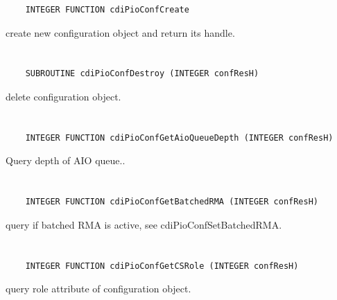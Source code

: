 \begin{verbatim}
    INTEGER FUNCTION cdiPioConfCreate
\end{verbatim}

create new configuration object and return its handle.


\section*{\tt {}}

\begin{verbatim}
    SUBROUTINE cdiPioConfDestroy (INTEGER confResH)
\end{verbatim}

delete configuration object.


\section*{\tt {}}

\begin{verbatim}
    INTEGER FUNCTION cdiPioConfGetAioQueueDepth (INTEGER confResH)
\end{verbatim}

Query depth of AIO queue..


\section*{\tt {}}

\begin{verbatim}
    INTEGER FUNCTION cdiPioConfGetBatchedRMA (INTEGER confResH)
\end{verbatim}

query if batched RMA is active, see
cdiPioConfSetBatchedRMA.


\section*{\tt {}}

\begin{verbatim}
    INTEGER FUNCTION cdiPioConfGetCSRole (INTEGER confResH)
\end{verbatim}

query role attribute of configuration object.


\section*{\tt {}}

